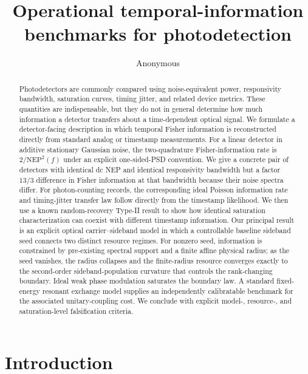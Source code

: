 \documentclass[aps,pra,reprint,superscriptaddress,longbibliography]{revtex4-2}
\begin{document}
\title{Operational temporal-information benchmarks for photodetection}

\author{Anonymous}

\begin{abstract}
Photodetectors are commonly compared using noise-equivalent power, responsivity bandwidth, saturation curves, timing jitter, and related device metrics. These quantities are indispensable, but they do not in general determine how much information a detector transfers about a time-dependent optical signal. We formulate a detector-facing description in which temporal Fisher information is reconstructed directly from standard analog or timestamp measurements. For a linear detector in additive stationary Gaussian noise, the two-quadrature Fisher-information rate is $2/\mathrm{NEP}^2(f)$ under an explicit one-sided-PSD convention. We give a concrete pair of detectors with identical dc NEP and identical responsivity bandwidth but a factor $13/3$ difference in Fisher information at that bandwidth because their noise spectra differ. For photon-counting records, the corresponding ideal Poisson information rate and timing-jitter transfer law follow directly from the timestamp likelihood. We then use a known random-recovery Type-II result to show how identical saturation characterization can coexist with different timestamp information. Our principal result is an explicit optical carrier--sideband model in which a controllable baseline sideband seed connects two distinct resource regimes. For nonzero seed, information is constrained by pre-existing spectral support and a finite affine physical radius; as the seed vanishes, the radius collapses and the finite-radius resource converges exactly to the second-order sideband-population curvature that controls the rank-changing boundary. Ideal weak phase modulation saturates the boundary law. A standard fixed-energy resonant exchange model supplies an independently calibratable benchmark for the associated unitary-coupling cost. We conclude with explicit model-, resource-, and saturation-level falsification criteria.
\end{abstract}

\maketitle

\section{Introduction}
\end{document}
